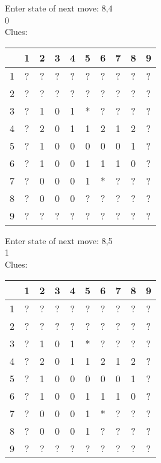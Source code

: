 Enter state of next move: 8,4\\
0\\
Clues:\\
\begin{tabular}{|c|c|c|c|c|c|c|c|c|c|}
\hline
  & 1 & 2 & 3 & 4 & 5 & 6 & 7 & 8 & 9\\
\hline
1 & ? & ? & ? & ? & ? & ? & ? & ? & ?\\
\hline
2 & ? & ? & ? & ? & ? & ? & ? & ? & ?\\
\hline
3 & ? & 1 & 0 & 1 & * & ? & ? & ? & ?\\
\hline
4 & ? & 2 & 0 & 1 & 1 & 2 & 1 & 2 & ?\\
\hline
5 & ? & 1 & 0 & 0 & 0 & 0 & 0 & 1 & ?\\
\hline
6 & ? & 1 & 0 & 0 & 1 & 1 & 1 & 0 & ?\\
\hline
7 & ? & 0 & 0 & 0 & 1 & * & ? & ? & ?\\
\hline
8 & ? & 0 & 0 & 0 & ? & ? & ? & ? & ?\\
\hline
9 & ? & ? & ? & ? & ? & ? & ? & ? & ?\\
\hline
\end{tabular}

Enter state of next move: 8,5\\
1\\
Clues:\\
\begin{tabular}{|c|c|c|c|c|c|c|c|c|c|}
\hline
  & 1 & 2 & 3 & 4 & 5 & 6 & 7 & 8 & 9\\
\hline
1 & ? & ? & ? & ? & ? & ? & ? & ? & ?\\
\hline
2 & ? & ? & ? & ? & ? & ? & ? & ? & ?\\
\hline
3 & ? & 1 & 0 & 1 & * & ? & ? & ? & ?\\
\hline
4 & ? & 2 & 0 & 1 & 1 & 2 & 1 & 2 & ?\\
\hline
5 & ? & 1 & 0 & 0 & 0 & 0 & 0 & 1 & ?\\
\hline
6 & ? & 1 & 0 & 0 & 1 & 1 & 1 & 0 & ?\\
\hline
7 & ? & 0 & 0 & 0 & 1 & * & ? & ? & ?\\
\hline
8 & ? & 0 & 0 & 0 & 1 & ? & ? & ? & ?\\
\hline
9 & ? & ? & ? & ? & ? & ? & ? & ? & ?\\
\hline
\end{tabular}

